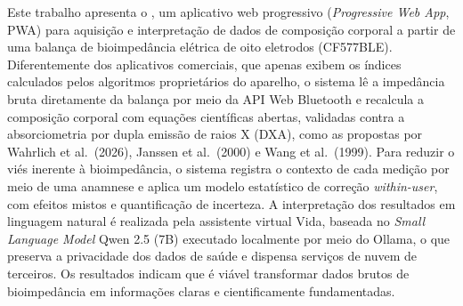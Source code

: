 Este trabalho apresenta o \sintonia, um aplicativo web progressivo (\emph{Progressive
Web App}, PWA) para aquisição e interpretação de dados de composição corporal a
partir de uma balança de bioimpedância elétrica de oito eletrodos (CF577BLE).
Diferentemente dos aplicativos comerciais, que apenas exibem os índices calculados
pelos algoritmos proprietários do aparelho, o sistema lê a impedância bruta
diretamente da balança por meio da API Web Bluetooth e recalcula a composição
corporal com equações científicas abertas, validadas contra a absorciometria por
dupla emissão de raios X (DXA), como as propostas por Wahrlich et al.\ (2026),
Janssen et al.\ (2000) e Wang et al.\ (1999). Para reduzir o viés inerente à
bioimpedância, o sistema registra o contexto de cada medição por meio de uma
anamnese e aplica um modelo estatístico de correção \emph{within-user}, com efeitos
mistos e quantificação de incerteza. A interpretação dos resultados em linguagem
natural é realizada pela assistente virtual Vida, baseada no \emph{Small Language
Model} Qwen 2.5 (7B) executado localmente por meio do Ollama, o que preserva a
privacidade dos dados de saúde e dispensa serviços de nuvem de terceiros. Os
resultados indicam que é viável transformar dados brutos de bioimpedância em
informações claras e cientificamente fundamentadas.
